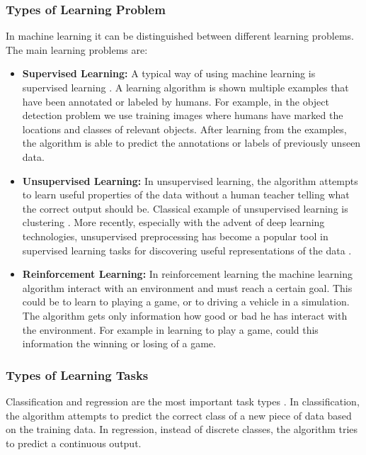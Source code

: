 \subsubsection*{Types of Learning Problem}
In machine learning it can be distinguished between different learning problems. The main learning problems are:
\begin{itemize}
	\item \textbf{Supervised Learning:} A typical way of using machine learning is supervised learning \cite{bishop2006pattern}. A learning algorithm is shown multiple examples that have been annotated or labeled by humans. For example, in the object detection problem we use training images where humans have marked the locations and classes of relevant objects. After learning from the examples, the algorithm is able to predict the annotations or labels of previously unseen data. 
	\item \textbf{Unsupervised Learning:} In unsupervised learning, the algorithm attempts to learn useful properties of the data without a human teacher telling what the correct output should be. Classical example of unsupervised learning is clustering \cite{bishop2006pattern}. More recently, especially with the advent of deep learning technologies, unsupervised preprocessing has become a popular tool in supervised learning tasks for discovering useful representations of the data \cite{bengio2013representation}.
	\item \textbf{Reinforcement Learning:} In reinforcement learning the machine learning algorithm interact with an environment and must reach a certain goal. This could be to learn to playing a game, or to driving a vehicle in a simulation. The algorithm gets only information how good or bad he has interact with the environment. For example in learning to play a game, could this information the winning or losing of a game.
\end{itemize}

\subsubsection*{Types of Learning Tasks}
Classification and regression are the most important task types \cite{bishop2006pattern}. In classification, the algorithm attempts to predict the correct class of a new piece of data based on the training data. In regression, instead of discrete classes, the algorithm tries to predict a continuous output.

